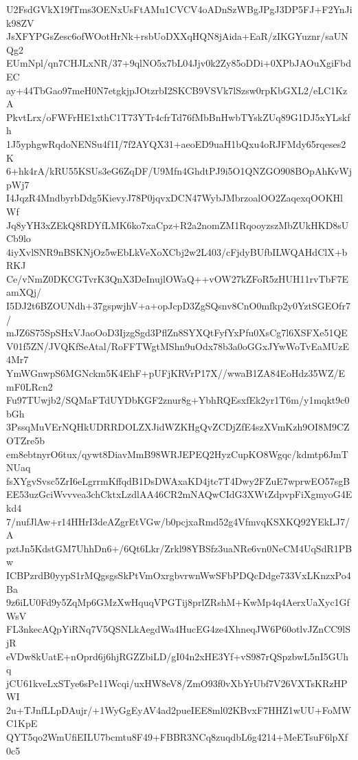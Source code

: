 U2FsdGVkX19fTms3OENxUsFtAMu1CVCV4oADnSzWBgJPgJ3DP5FJ+F2YnJik98ZV
JsXFYPGsZesc6ofWOotHrNk+rsbUoDXXqHQN8jAida+EaR/zIKGYuznr/saUNQg2
EUmNpl/qn7CHJLxNR/37+9qlNO5x7bL04Jjv0k2Zy85oDDi+0XPbJAOuXgiFbdEC
ay+44TbGao97meH0N7etgkjpJOtzrbI2SKCB9VSVk7lSzsw0rpKbGXL2/eLC1KzA
PkvtLrx/oFWFrHE1xthC1T73YTr4cfrTd76fMbBnHwbTYskZUq89G1DJ5xYLskfh
1J5yphgwRqdoNENSu4f1I/7f2AYQX31+aeoED9uaH1bQxu4oRJFMdy65rqeses2K
6+hk4rA/kRU55KSUs3eG6ZqDF/U9Mfn4GhdtPJ9i5O1QNZGO908BOpAhKvWjpWj7
I4JqzR4MndbyrbDdg5KievyJ78P0jqvxDCN47WybJMbrzoalOO2ZaqexqOOKHlWf
Jq8yYH3xZEkQ8RDYfLMK6ko7xaCpz+R2a2nomZM1RqooyzszMbZUkHKD8sUCb9lo
4iyXvlSNR9nBSKNjOz5wEbLkVeXoXCbj2w2L403/cFjdyBUfbILWQAHdClX+bRKJ
Ce/vNmZ0DKCGTvrK3QnX3DeInujlOWaQ++vOW27kZFoR5zHUH11rvTbF7EamXQj/
I5DJ2t6BZOUNdh+37gspwjhV+a+opJcpD3ZgSQsnv8CnO0mfkp2y0YztSGEOfr7/
mJZ6S75SpSHxVJaoOoD3IjzgSgd3PflZn8SYXQtFyfYxPfu0XsCg7l6XSFXe51QE
V01f5ZN/JVQKfSeAtal/RoFFTWgtMShn9uOdx78b3a0oGGxJYwWoTvEaMUzE4Mr7
YmWGnwpS6MGNckm5K4EhF+pUFjKRVrP17X//wwaB1ZA84EoHdz35WZ/EmF0LRcn2
Fu97TUwjb2/SQMaFTdUYDbKGF2znur8g+YbhRQEsxfEk2yr1T6m/y1mqkt9c0bGh
3PssqMuVErNQHkUDRRDOLZXJidWZKHgQvZCDjZfE4szXVmKzh9OI8M9CZOTZre5b
em8ebtnyrO6tux/qywt8DiavMmB98WRJEPEQ2HyzCupKO8Wgqc/kdmtp6JmTNUaq
fsXYgvSvsc5ZrI6eLgrrmKffqdB1DsDWAxaKD4jtc7T4Dwy2FZuE7wprwEO57sgB
EE53uzGciWvvvea3chCktxLzdlAA46CR2mNAQwCIdG3XWtZdpvpFiXgmyoG4Ekd4
7/nufJlAw+r14HHrI3deAZgrEtVGw/b0pcjxaRmd52g4VfmvqKSXKQ92YEkLJ7/A
pztJn5KdstGM7UhhDn6+/6Qt6Lkr/Zrkl98YBSfz3uaNRe6vn0NeCM4UqSdR1PBw
ICBPzrdB0yypS1rMQgsgsSkPtVmOxrgbvrwnWwSFbPDQcDdge733VxLKnzxPo4Ba
9z6iLU0Fd9y5ZqMp6GMzXwHquqVPGTij8prlZRshM+KwMp4q4AerxUaXyc1GfWsV
FL3nkecAQpYiRNq7V5QSNLkAegdWa4HucEG4ze4XhneqJW6P60otlvJZnCC9lSjR
eVDw8kUatE+nOprd6j6hjRGZZbiLD/gI04n2xHE3Yf+vS987rQSpzbwL5nI5GUhq
jCU61kveLxSTye6sPe11Wcqi/uxHW8eV8/ZmO93f0vXbYrUbf7V26VXTsKRzHPWI
2u+TJnfLLpDAujr/+1WyGgEyAV4ad2pueIEE8ml02KBvxF7HHZ1wUU+FoMWC1KpE
QYT5qo2WmUfiEILU7bcmtu8F49+FBBR3NCq8zuqdbL6g4214+MeETsuF6lpXf0c5
